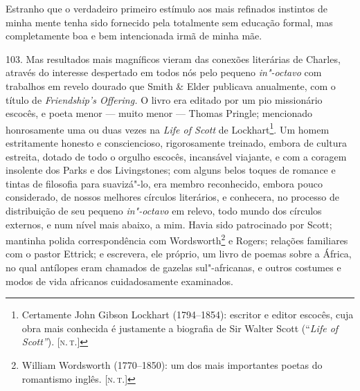 Estranho que o verdadeiro primeiro estímulo aos mais refinados instintos
de minha mente tenha sido fornecido pela totalmente sem educação formal,
mas completamente boa e bem intencionada irmã de minha mãe.

103. Mas resultados mais magníficos vieram das conexões literárias de
Charles, através do interesse despertado em todos nós pelo pequeno
\emph{in"-octavo} com trabalhos em revelo dourado que Smith \& Elder
publicava anualmente, com o título de \emph{Friendship's Offering.} O
livro era editado por um pio missionário escocês, e poeta menor --- muito
menor --- Thomas Pringle; mencionado honrosamente uma ou duas vezes na
\emph{Life of Scott} de Lockhart\footnote{Certamente John Gibson
  Lockhart (1794--1854): escritor e editor escocês, cuja obra mais
  conhecida é justamente a biografia de Sir Walter Scott (``\emph{Life
  of Scott''}). {[}\textsc{n.\,t.}{]}}. Um homem estritamente honesto e
consciencioso, rigorosamente treinado, embora de cultura estreita,
dotado de todo o orgulho escocês, incansável viajante, e com a coragem
insolente dos Parks e dos Livingstones; com alguns belos toques de
romance e tintas de filosofia para suavizá"-lo, era membro reconhecido,
embora pouco considerado, de nossos melhores círculos literários, e
conhecera, no processo de distribuição de seu pequeno \emph{in"-octavo}
em relevo, todo mundo dos círculos externos, e num nível mais abaixo, a
mim. Havia sido patrocinado por Scott; mantinha polida correspondência
com Wordsworth\footnote{William Wordsworth (1770--1850): um dos mais
  importantes poetas do romantismo inglês. {[}\textsc{n.\,t.}{]}} e Rogers;
relações familiares com o pastor Ettrick; e escrevera, ele próprio, um
livro de poemas sobre a África, no qual antílopes eram chamados de
gazelas sul"-africanas, e outros costumes e modos de vida africanos
cuidadosamente examinados.


